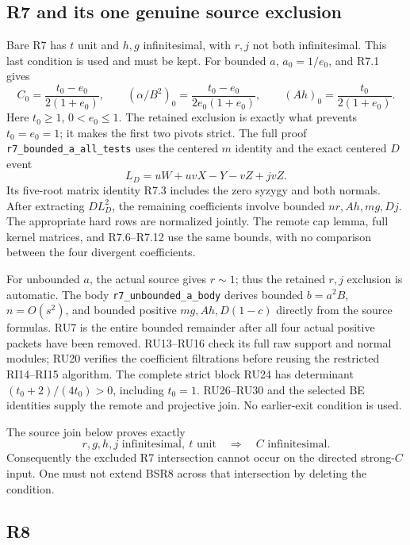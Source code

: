 \subsection{R7 and its one genuine source exclusion}

Bare R7 has \(t\) unit and \(h,g\) infinitesimal, with
\(r,j\) not both infinitesimal.  This last condition
is used and must be kept.
For bounded \(a\), \(a_0=1/e_0\), and R7.1 gives
\[
 C_0=\frac{t_0-e_0}{2(1+e_0)},\qquad
 (\alpha/B^2)_0=\frac{t_0-e_0}{2e_0(1+e_0)},\qquad
 (Ah)_0=\frac{t_0}{2(1+e_0)}.
 \tag{BSR8}
\]
Here \(t_0\geq1\), \(0<e_0\leq1\).
The retained exclusion is exactly what prevents
\(t_0=e_0=1\); it makes the first two pivots strict.
The full proof \texttt{r7\_bounded\_a\_all\_tests}
uses the centered \(m\) identity and the exact
centered \(D\) event
\[
 L_D=uW+uvX-Y-vZ+jvZ .
 \tag{BSR9}
\]
Its five-root matrix identity R7.3 includes the zero
syzygy and both normals.  After extracting \(DL_D^2\),
the remaining coefficients involve bounded \(nr,Ah,mg,Dj\).
The appropriate hard rows are normalized jointly.
The remote cap lemma, full kernel matrices, and
R7.6--R7.12 use the same bounds, with no comparison
between the four divergent coefficients.

For unbounded \(a\), the actual source gives \(r\sim1\);
thus the retained \(r,j\) exclusion is automatic.
The body \texttt{r7\_unbounded\_a\_body} derives bounded
\(b=a^2B\), \(n=O(s^2)\), and bounded positive
\(mg,Ah,D(1-c)\) directly from the source formulas.
RU7 is the entire bounded remainder after all four
actual positive packets have been removed.
RU13--RU16 check its full raw support and normal modules;
RU20 verifies the coefficient filtrations before reusing
the restricted RI14--RI15 algorithm.
The complete strict block RU24 has determinant
\((t_0+2)/(4t_0)>0\), including \(t_0=1\).
RU26--RU30 and the selected BE identities supply the
remote and projective join.  No earlier-exit condition
is used.

The source join below proves exactly
\[
 r,g,h,j\text{ infinitesimal},\ t\text{ unit}
 \quad\Longrightarrow\quad C\text{ infinitesimal}.
 \tag{BSR10}
\]
Consequently the excluded R7 intersection cannot occur
on the directed strong-\(C\) input.  One must not extend
BSR8 across that intersection by deleting the condition.

\subsection{R8}

